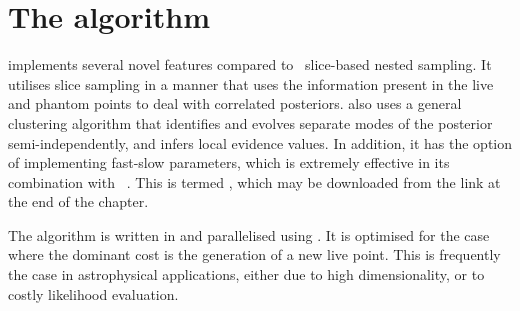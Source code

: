 




\section{The \PolyChord{} algorithm}
\label{sec:pc:polychord_algorithm}

\PolyChord{} implements several novel features compared to~ slice-based nested sampling.  
It utilises slice sampling in a manner that uses the information present in the live and phantom points to deal with correlated posteriors. 
\PolyChord{} also uses a general clustering algorithm that identifies and evolves separate modes of the posterior semi-independently, and infers local evidence values.  
In addition, it has the option of implementing fast-slow parameters, which is extremely effective in its combination with \CosmoMC{}~\citep{cosmomc}. 
This is termed \CosmoChord, which may be downloaded from the link at the end of the chapter.

 The algorithm is written in \FORTRAN{} and parallelised using \openMPI{}.  It is optimised for the case where the dominant cost is the generation of a new live point.  This is frequently the case in astrophysical applications, either due to high dimensionality, or to costly likelihood evaluation.  

